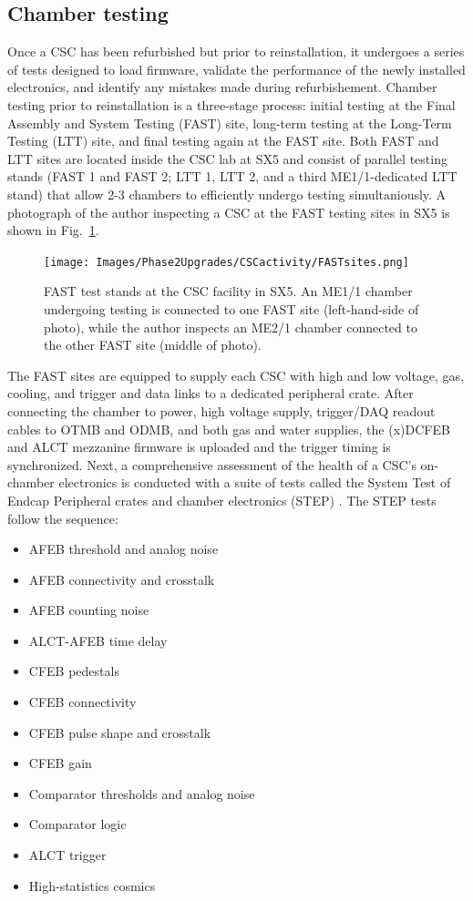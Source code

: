 \subsection{Chamber testing} \label{sec:ChamberTesting}

Once a CSC has been refurbished but prior to reinstallation, it undergoes a series of tests designed to load firmware, validate the performance of the newly installed electronics, and identify any mistakes made during refurbishement. Chamber testing prior to reinstallation is a three-stage process: initial testing at the Final Assembly and System Testing (FAST) site, long-term testing at the Long-Term Testing (LTT) site, and final testing again at the FAST site. Both FAST and LTT sites are located inside the CSC lab at SX5 and consist of parallel testing stands (FAST 1 and FAST 2; LTT 1, LTT 2, and a third ME1/1-dedicated LTT stand) that allow 2-3 chambers to efficiently undergo testing simultaniously. A photograph of the author inspecting a CSC at the FAST testing sites in SX5 is shown in Fig.~\ref{fig:FAST}.

\begin{figure}[H]
    \centering
    \texttt{[image: Images/Phase2Upgrades/CSCactivity/FASTsites.png]}
    \caption{FAST test stands at the CSC facility in SX5. An ME1/1 chamber undergoing testing is connected to one FAST site (left-hand-side of photo), while the author inspects an ME2/1 chamber connected to the other FAST site (middle of photo).}
    \label{fig:FAST}
\end{figure}

The FAST sites are equipped to supply each CSC with high and low voltage, gas, cooling, and trigger and data links to a dedicated peripheral crate. After connecting the chamber to power, high voltage supply, trigger/DAQ readout cables to OTMB and ODMB, and both gas and water supplies, the (x)DCFEB and ALCT mezzanine firmware is uploaded and the trigger timing is synchronized. Next, a comprehensive assessment of the health of a CSC's on-chamber electronics is conducted with a suite of tests called the System Test of Endcap Peripheral crates and chamber electronics (STEP) . The STEP tests follow the sequence:
\begin{itemize}
    \item AFEB threshold and analog noise
    \item AFEB connectivity and crosstalk
    \item AFEB counting noise
    \item ALCT-AFEB time delay
    \item CFEB pedestals
    \item CFEB connectivity
    \item CFEB pulse shape and crosstalk
    \item CFEB gain
    \item Comparator thresholds and analog noise
    \item Comparator logic
    \item ALCT trigger
    \item High-statistics cosmics
\end{itemize}

